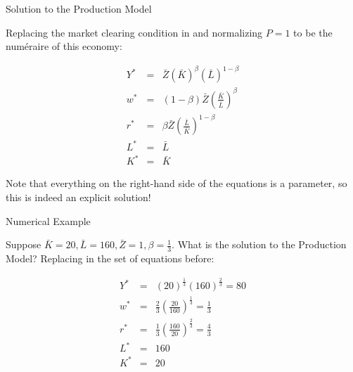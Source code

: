 \documentclass[notes,11pt, aspectratio=169, xcolor=table]{beamer}
\begin{document}
\begin{frame}{Solution to the Production Model}

Replacing the market clearing condition in and normalizing $P=1$ to be the num\'eraire of this economy:

  \begin{eqnarray}
    Y^* &=& \bar{Z} (\bar{K})^{\beta} (\bar{L})^{1-\beta} \\
    w^* &=& (1-\beta) \bar{Z} \left( \frac{\bar{K}}{\bar{L}} \right)^\beta  \\
     r^* &=&  \beta \bar{Z} \left( \frac{\bar{L}}{\bar{K}} \right)^{1-\beta}  \\
     L^* &=& \bar{L}  \\
     K^* &=& \bar{K}
  \end{eqnarray}

Note that everything on the right-hand side of the equations is a parameter, so this is indeed an explicit solution!
\end{frame}

\begin{frame}{Numerical Example}

Suppose $\bar{K} = 20, \bar{L} = 160, \bar{Z}=1, \beta=\frac{1}{3}$. What is the solution to the Production Model? Replacing in the set of equations before:

  \begin{eqnarray*}
    Y^* &=&  (20)^{\frac{1}{3}}  (160)^{\frac{2}{3}} = 80 \\
    w^* &=& \frac{2}{3} \left( \frac{20}{160} \right)^{\frac{1}{3}} = \frac{1}{3} \\
     r^* &=&  \frac{1}{3} \left( \frac{160}{20} \right)^{\frac{2}{3}} = \frac{4}{3}  \\
     L^* &=& 160  \\
     K^* &=& 20
  \end{eqnarray*}
\end{frame}
\end{document}
